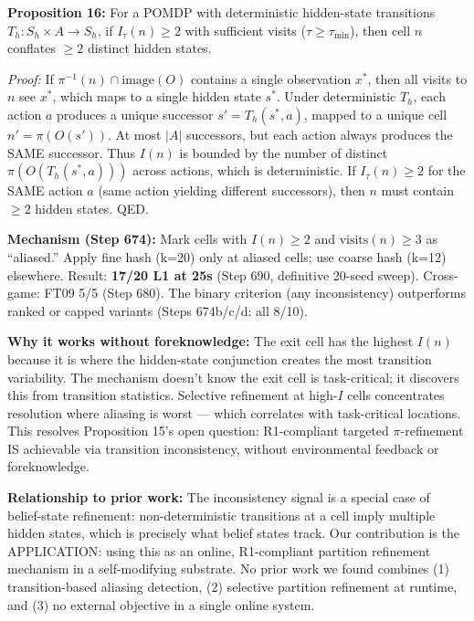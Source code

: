 \documentclass[
  11pt,
]{article}
\begin{document}
\textbf{Proposition 16:} For a POMDP with deterministic hidden-state
transitions \(T_h: S_h \times A \to S_h\), if \(I_\tau(n) \geq 2\) with
sufficient visits (\(\tau \geq \tau_{\min}\)), then cell \(n\) conflates
\(\geq 2\) distinct hidden states.

\emph{Proof:} If \(\pi^{-1}(n) \cap \text{image}(O)\) contains a single
observation \(x^*\), then all visits to \(n\) see \(x^*\), which maps to
a single hidden state \(s^*\). Under deterministic \(T_h\), each action
\(a\) produces a unique successor \(s' = T_h(s^*, a)\), mapped to a
unique cell \(n' = \pi(O(s'))\). At most \(|A|\) successors, but each
action always produces the SAME successor. Thus \(I(n)\) is bounded by
the number of distinct \(\pi(O(T_h(s^*, a)))\) across actions, which is
deterministic. If \(I_\tau(n) \geq 2\) for the SAME action \(a\) (same
action yielding different successors), then \(n\) must contain
\(\geq 2\) hidden states. QED.

\textbf{Mechanism (Step 674):} Mark cells with \(I(n) \geq 2\) and
\(\text{visits}(n) \geq 3\) as ``aliased.'' Apply fine hash (k=20) only
at aliased cells; use coarse hash (k=12) elsewhere. Result:
\textbf{17/20 L1 at 25s} (Step 690, definitive 20-seed sweep).
Cross-game: FT09 5/5 (Step 680). The binary criterion (any
inconsistency) outperforms ranked or capped variants (Steps 674b/c/d:
all 8/10).

\textbf{Why it works without foreknowledge:} The exit cell has the
highest \(I(n)\) because it is where the hidden-state conjunction
creates the most transition variability. The mechanism doesn't know the
exit cell is task-critical; it discovers this from transition
statistics. Selective refinement at high-\(I\) cells concentrates
resolution where aliasing is worst --- which correlates with
task-critical locations. This resolves Proposition 15's open question:
R1-compliant targeted \(\pi\)-refinement IS achievable via transition
inconsistency, without environmental feedback or foreknowledge.

\textbf{Relationship to prior work:} The inconsistency signal is a
special case of belief-state refinement: non-deterministic transitions
at a cell imply multiple hidden states, which is precisely what belief
states track. Our contribution is the APPLICATION: using this as an
online, R1-compliant partition refinement mechanism in a self-modifying
substrate. No prior work we found combines (1) transition-based aliasing
detection, (2) selective partition refinement at runtime, and (3) no
external objective in a single online system.
\end{document}
